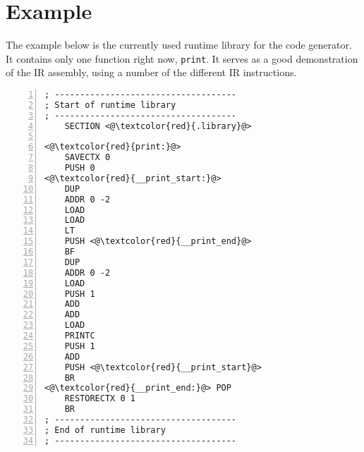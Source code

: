 \documentclass[oneside]{amsart}
\theoremstyle{definition}
\theoremstyle{remark}
\numberwithin{equation}{section}
\begin{document}
\section{Example}
The example below is the currently used runtime library for the code generator. It contains only
one function right now, \texttt{print}. It serves as a good demonstration of the IR assembly, using
a number of the different IR instructions.
\begin{lstlisting}[numbers=left]
; ------------------------------------
; Start of runtime library
; ------------------------------------
    SECTION <@\textcolor{red}{.library}@>

<@\textcolor{red}{print:}@>
    SAVECTX 0
    PUSH 0
<@\textcolor{red}{__print_start:}@>
    DUP
    ADDR 0 -2
    LOAD
    LOAD
    LT
    PUSH <@\textcolor{red}{__print_end}@>
    BF
    DUP
    ADDR 0 -2
    LOAD
    PUSH 1
    ADD
    ADD
    LOAD
    PRINTC
    PUSH 1
    ADD
    PUSH <@\textcolor{red}{__print_start}@>
    BR
<@\textcolor{red}{__print_end:}@> POP
    RESTORECTX 0 1
    BR
; ------------------------------------
; End of runtime library
; ------------------------------------
\end{lstlisting}


\end{document}
